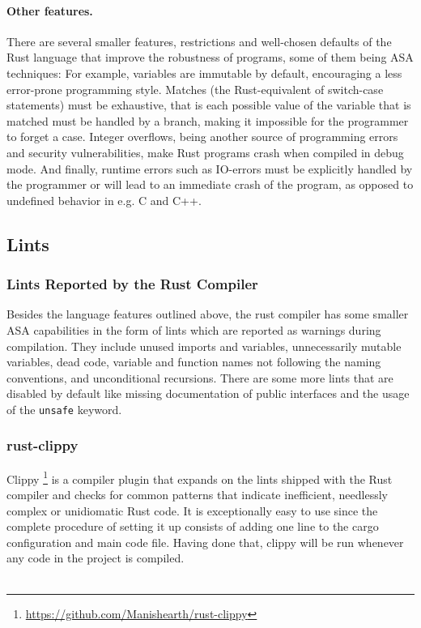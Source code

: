 \documentclass{scrartcl}
\begin{document}
\paragraph{Other features.} There are several smaller features, restrictions and well-chosen defaults of the Rust language that improve the robustness of programs, some of them being ASA techniques: For example, variables are immutable by default, encouraging a less error-prone programming style. Matches (the Rust-equivalent of switch-case statements) must be exhaustive, that is each possible value of the variable that is matched must be handled by a branch, making it impossible for the programmer to forget a case. Integer overflows, being another source of programming errors and security vulnerabilities, make Rust programs crash when compiled in debug mode. And finally, runtime errors such as IO-errors must be explicitly handled by the programmer or will lead to an immediate crash of the program, as opposed to undefined behavior in e.g. C and C++.


\subsection{Lints}

\subsubsection{Lints Reported by the Rust Compiler}

Besides the language features outlined above, the rust compiler has some smaller ASA capabilities in the form of lints which are reported as warnings during compilation. They include unused imports and variables, unnecessarily mutable variables, dead code, variable and function names not following the naming conventions, and unconditional recursions. There are some more lints that are disabled by default like missing documentation of public interfaces and the usage of the \texttt{unsafe} keyword.

\subsubsection{rust-clippy} \label{clippy}

Clippy \footnote{\url{https://github.com/Manishearth/rust-clippy}} is a compiler plugin that expands on the lints shipped with the Rust compiler and checks for common patterns that indicate inefficient, needlessly complex or unidiomatic Rust code. It is exceptionally easy to use since the complete procedure of setting it up consists of adding one line to the cargo configuration and main code file. Having done that, clippy will be run whenever any code in the project is compiled.\\
\\
\end{document}
